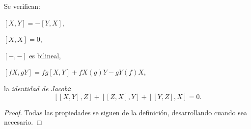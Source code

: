 \begin{nprop}
  Se verifican:
  \begin{nlist}
  \item
    $[X,Y]=-[Y,X]$,
  \item
    $[X,X] = 0$,
  \item
    $[-,-]$ es bilineal,
  \item
    $[fX,gY] = fg[X,Y] + fX(g)Y - gY(f)X$,
  \item
    la \emph{identidad de Jacobi}:
    \[
      [[X,Y],Z] + [[Z,X],Y] + [[Y,Z],X] = 0
    .\]
  \end{nlist}
\end{nprop}
\begin{proof}
  Todas las propiedades se siguen de la definición, desarrollando cuando sea necesario.
\end{proof}

